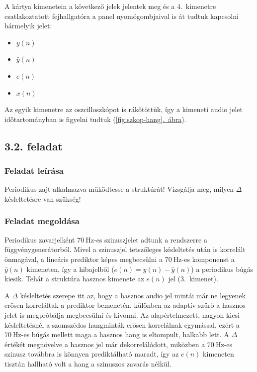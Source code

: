 \documentclass[12pt,a4paper]{article}
\newcommand{\abrara}[1]{\hyperref[#1]{\ref*{#1}.~ábra}}
\newcommand{\feladat}[1]{%
\phantomsection
\subsection*{#1. feladat}%
\addcontentsline{toc}{subsection}{#1. feladat}%
}
\begin{document}
A kártya kimenetein a következő jelek jelentek meg és a 4.~kimenetre csatlakoztatott fejhallgatóra a panel nyomógombjaival is át tudtuk kapcsolni bármelyik jelet:
\begin{itemize}
    \item $y(n)$
    \item $\hat{y}(n)$
    \item $e(n)$
    \item $x(n)$
\end{itemize}



Az egyik kimenetre az oszcilloszkópot is rákötöttük, így a kimeneti audio jelet időtartományban is figyelni tudtuk (\abrara{fig:szkop-hang}).


\feladat{3.2}

\subsubsection*{Feladat leírása}

Periodikus zajt alkalmazva működtesse a struktúrát! Vizsgálja meg, milyen $\Delta$ késleltetésre van szükség!

\subsubsection*{Feladat megoldása}

Periodikus zavarjelként $70~\mathrm{Hz}$-es szinuszjelet adtunk a rendszerre a függvénygenerátorból. Mivel a szinuszjel tetszőleges késleltetés után is korrelált önmagával, a lineáris prediktor képes megbecsülni a $70~\mathrm{Hz}$-es komponenst a $\hat{y}(n)$ kimeneten, így a hibajelből ($e(n) = y(n) - \hat{y}(n)$) a periodikus búgás kiesik. Tehát a struktúra hasznos kimenete az $e(n)$ jel (3.~kimenet).\par\medskip

A $\Delta$ késleltetés szerepe itt az, hogy a hasznos audio jel mintái már ne legyenek erősen korreláltak a prediktor bemenetén, különben az adaptív szűrő a hasznos jelet is megpróbálja megbecsülni és kivonni. Az alapértelmezett, nagyon kicsi késleltetésnél a szomszédos hangminták erősen korrelálnak egymással, ezért a $70~\mathrm{Hz}$-es búgás mellett maga a hasznos hang is eltompult, halkabb lett. A $\Delta$ értékét megnövelve a hasznos jel már dekorrelálódott, miközben a $70~\mathrm{Hz}$-es szinusz továbbra is könnyen prediktálható maradt, így az $e(n)$ kimeneten tisztán hallható volt a hang a szinuszos zavarás nélkül.
\end{document}
